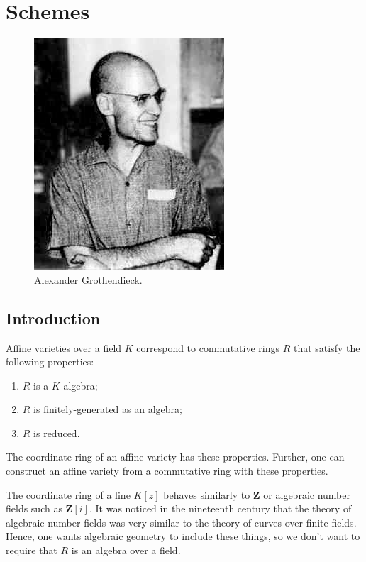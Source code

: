 \documentclass [11 pt, oneside] {article}
\begin{document}
\section{Schemes}

\begin{figure}
\begin{center}
\includegraphics[scale=0.8]{images/groth}
\caption{Alexander Grothendieck.}
\end{center}
\end{figure}

\subsection{Introduction}
Affine varieties over a field $K$ correspond to commutative rings $R$ that satisfy the following properties:
\begin{enumerate}
	\item $R$ is a $K$-algebra;
	\item $R$ is finitely-generated as an algebra;
	\item $R$ is reduced.
\end{enumerate}
The coordinate ring of an affine variety has these properties. Further, one can construct an affine variety from a commutative ring with these properties.

The coordinate ring of a line $K[z]$ behaves similarly to $\mathbf{Z}$ or algebraic number fields such as $\mathbf{Z}[i]$. It was noticed in the nineteenth century that the theory of algebraic number fields was very similar to the theory of curves over finite fields. Hence, one wants algebraic geometry to include these things, so we don't want to require that $R$ is an algebra over a field. 
\end{document}
